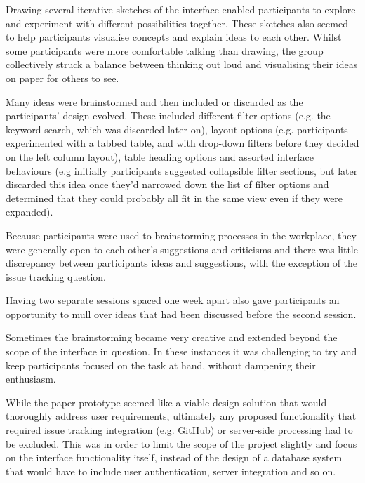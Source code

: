 Drawing several iterative sketches of the interface enabled participants to explore and experiment with different possibilities together. These sketches also seemed to help participants visualise concepts and explain ideas to each other. Whilst some participants were more comfortable talking than drawing, the group collectively struck a balance between thinking out loud and visualising their ideas on paper for others to see.

Many ideas were brainstormed and then included or discarded as the participants' design evolved. These included different filter options (e.g. the keyword search, which was discarded later on), layout options (e.g. participants experimented with a tabbed table, and with drop-down filters before they decided on the left column layout), table heading options and assorted interface behaviours (e.g initially participants suggested collapsible filter sections, but later discarded this idea once they'd narrowed down the list of filter options and determined that they could probably all fit in the same view even if they were expanded).  

Because participants were used to brainstorming processes in the workplace, they were generally open to each other's suggestions and criticisms and there was little discrepancy between participants ideas and suggestions, with the exception of the issue tracking question. 

Having two separate sessions spaced one week apart also gave participants an opportunity to mull over ideas that had been discussed before the second session. 

Sometimes the brainstorming became very creative and extended beyond the scope of the interface in question. In these instances it  was challenging to try and keep participants focused on the task at hand, without dampening their enthusiasm. 

While the paper prototype seemed like a viable design solution that would thoroughly address user requirements, ultimately any proposed functionality that required issue tracking integration (e.g. GitHub) or server-side processing had to be excluded. This was in order to limit the scope of the project slightly and focus on the interface functionality itself, instead of the design of a database system that would have to include user authentication, server integration and so on. 
